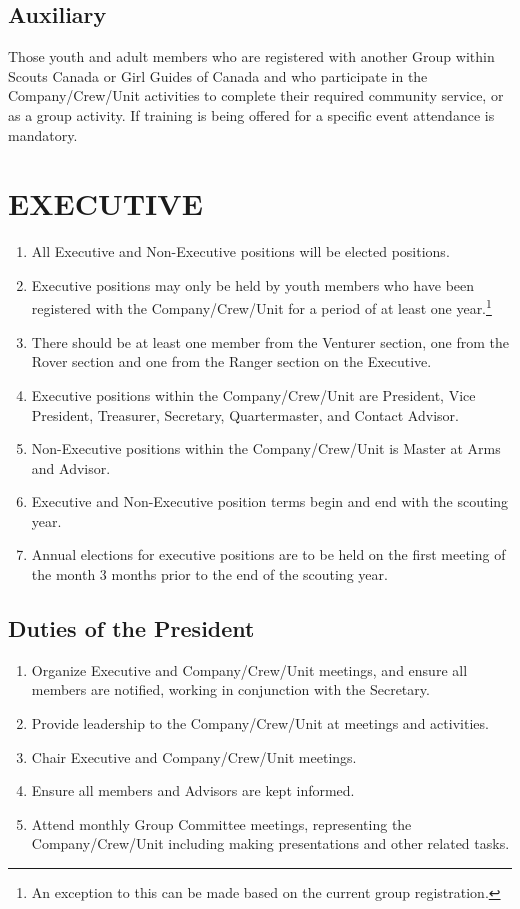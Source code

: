 \documentclass{Service_Corps_Document}
\begin{document}
\subsection{Auxiliary}
Those youth and adult members who are registered with another Group within Scouts Canada or Girl Guides of Canada and who participate in the Company/Crew/Unit activities to complete their required community service, or as a group activity. If training is being offered for a specific event attendance is mandatory. 
\section{EXECUTIVE}
\begin{enumerate}
	\item All Executive and Non-Executive positions will be elected positions.
	\item Executive positions may only be held by youth members who have been registered with the Company/Crew/Unit for a period of at least one year.\footnote{An exception to this can be made based on the current group registration.}
	\item There should be at least one member from the Venturer section, one from the Rover section and one from the Ranger section on the Executive.\footnotemark[\value{footnote}]
	\item Executive positions within the Company/Crew/Unit are President, Vice President, Treasurer, Secretary, Quartermaster, and Contact Advisor.
	\item Non-Executive positions within the Company/Crew/Unit is Master at Arms and Advisor.
	\item Executive and Non-Executive position terms begin and end with the scouting year.
	\item Annual elections for executive positions are to be held on the first meeting of the month 3 months prior to the end of the scouting year.
\end{enumerate}
\subsection{Duties of the President}
\begin{enumerate}
	\item Organize Executive and Company/Crew/Unit meetings, and ensure all members are notified, working in conjunction with the Secretary.
	\item Provide leadership to the Company/Crew/Unit at meetings and activities. 
	\item Chair Executive and Company/Crew/Unit meetings.
	\item Ensure all members and Advisors are kept informed.
	\item Attend monthly Group Committee meetings, representing the Company/Crew/Unit including making presentations and other related tasks.
\end{enumerate}
\end{document}

